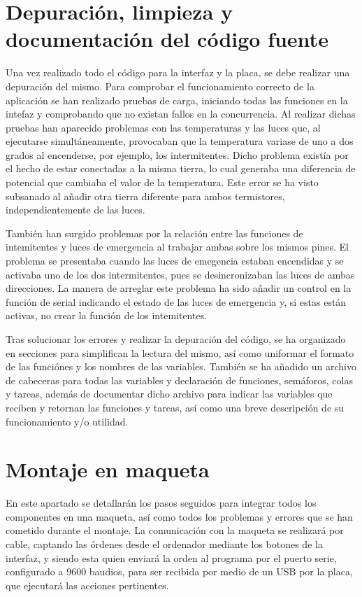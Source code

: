 \section{Depuración, limpieza y documentación del código fuente}

Una vez realizado todo el código para la interfaz y la placa, se debe realizar una depuración del mismo. Para comprobar el funcionamiento correcto de la aplicación se han realizado pruebas de carga, iniciando todas las funciones en la intefaz y comprobando que no existan fallos en la concurrencia. Al realizar dichas pruebas han aparecido problemas con las temperaturas y las luces que, al ejecutarse simultáneamente, provocaban que la temperatura variase de uno a dos grados al encenderse, por ejemplo, los intermitentes. Dicho problema existía por el hecho de estar conectadas a la misma tierra, lo cual generaba una diferencia de potencial que cambiaba el valor de la temperatura. Este error se ha visto subsanado al añadir otra tierra diferente para ambos termistores, independientemente de las luces. 

También han surgido problemas por la relación entre las funciones de intemitentes y luces de emergencia al trabajar ambas sobre los mismos pines. El problema se presentaba cuando las luces de emegencia estaban encendidas y se activaba uno de los dos intermitentes, pues se desincronizaban las luces de ambas direcciones. La manera de arreglar este problema ha sido añadir un control en la función de serial indicando el estado de las luces de emergencia y, si estas están activas, no crear la función de los intemitentes. 

Tras solucionar los errores y realizar la depuración del código, se ha organizado en secciones para simplifican la lectura del mismo, así como uniformar el formato de las funciónes y los nombres de las variables. También se ha añadido un archivo de cabeceras para todas las variables y declaración de funciones, semáforos, colas y tareas, además de documentar dicho archivo para indicar las variables que reciben y retornan las funciones y tareas, así como una breve descripción de su funcionamiento y/o utilidad. 


\section{Montaje en maqueta} 

En este apartado se detallarán los pasos seguidos para integrar todos los componentes en una maqueta, así como todos los problemas y errores que se han cometido durante el montaje. La comunicación con la maqueta se realizará por cable, captando las órdenes desde el ordenador mediante los botones de la interfaz, y siendo esta quien enviará la orden al programa por el puerto serie, configurado a 9600 baudios, para ser recibida por medio de un USB por la placa, que ejecutará las acciones pertinentes.\newline


